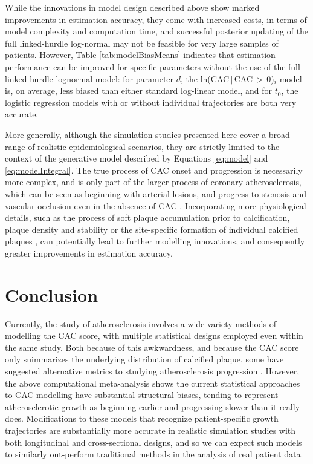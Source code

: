 \documentclass[aps,pre,twocolumn,twoside,tightenlines,groupedaddress,amsmath,amssymb,nobibnotes,final,showkeys,letterpaper]{revtex4-2}
\begin{document}
While the innovations in model design described above show marked improvements in estimation accuracy, they come with increased costs, in terms of model complexity and computation time, and successful posterior updating of the full linked-hurdle log-normal may not be feasible for very large samples of patients. However, Table \ref{tab:modelBiasMeans} indicates that estimation performance can be improved for specific parameters without the use of the full linked hurdle-lognormal model: for parameter $d$, the ln(CAC\,$|$\,CAC\,$>$\,0)$_i$ model is, on average, less biased than either standard log-linear model, and for $t_0$, the logistic regression models with or without individual trajectories are both very accurate.

More generally, although the simulation studies presented here cover a broad range of realistic epidemiological scenarios, they are strictly limited to the context of the generative model described by Equations \ref{eq:model} and \ref{eq:modelIntegral}. The true process of CAC onset and progression is necessarily more complex, and is only part of the larger process of coronary atherosclerosis, which can be seen as beginning with arterial lesions, and progress to stenosis and vascular occlusion even in the absence of CAC \cite{kelly2008angiography, gottlieb2010absence, nakahara2017calcification, gabriel2018zero}. Incorporating more physiological details, such as the process of soft plaque accumulation prior to calcification, plaque density and stability \cite{shioi2018plaque} or the site-specific formation of individual calcified plaques \cite{berman2016beyond}, can potentially lead to further modelling innovations, and consequently greater improvements in estimation accuracy.

\section{Conclusion}

Currently, the study of atherosclerosis involves a wide variety methods of modelling the CAC score, with multiple statistical designs employed even within the same study. Both because of this awkwardness, and because the CAC score only suimmarizes the underlying distribution of calcified plaque, some have suggested alternative metrics to studying atherosclerosis progression \cite{berman2016beyond, blaha2016improving}. However, the above computational meta-analysis shows the current statistical approaches to CAC modelling have substantial structural biases, tending to represent atherosclerotic growth as beginning earlier and progressing slower than it really does. Modifications to these models that recognize patient-specific growth trajectories are substantially more accurate in realistic simulation studies with both longitudinal and cross-sectional designs, and so we can expect such models to similarly out-perform traditional methods in the analysis of real patient data.
\end{document}
